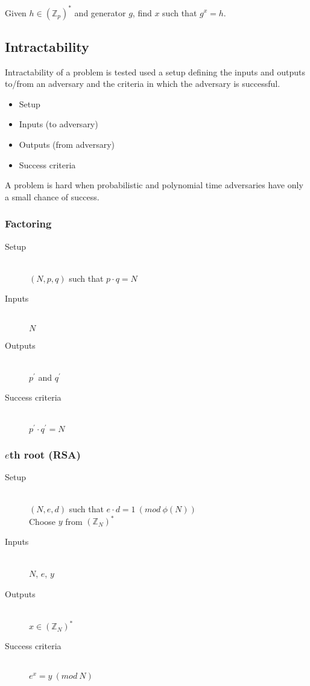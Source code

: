 \documentclass[a4paper]{article}
\begin{document}
Given $h \in (\mathbb{Z}_{p})^{*}$ and generator $g$, find $x$ such that $g^{x}
= h$.

\subsection{Intractability}

Intractability of a problem is tested used a setup defining the inputs and
outputs to/from an adversary and the criteria in which the adversary is
successful.

\begin{itemize}
  \item Setup
  \item Inputs (to adversary)
  \item Outputs (from adversary)
  \item Success criteria
\end{itemize}

A problem is hard when probabilistic and polynomial time adversaries have only
a small chance of success.

\subsubsection{Factoring}

\begin{description}
  \item[Setup] \hfill \\
    $(N, p, q)$ such that $p \cdot q = N$
  \item[Inputs] \hfill \\
    $N$
  \item[Outputs] \hfill \\
    $p^{\prime}$ and $q^{\prime}$
  \item[Success criteria] \hfill \\
    $p^{\prime} \cdot q^{\prime} = N$
\end{description}

\subsubsection{$e$th root (RSA)}

\begin{description}
  \item[Setup] \hfill \\
    $(N, e, d)$ such that $e \cdot d = 1 \: (mod \: \phi(N))$ \\
    Choose $y$ from $(\mathbb{Z}_{N})^{*}$
  \item[Inputs] \hfill \\
    $N$, $e$, $y$
  \item[Outputs] \hfill \\
    $x \in (\mathbb{Z}_{N})^{*}$
  \item[Success criteria] \hfill \\
    $e^{x} = y \: (mod \: N)$
\end{description}
\end{document}
